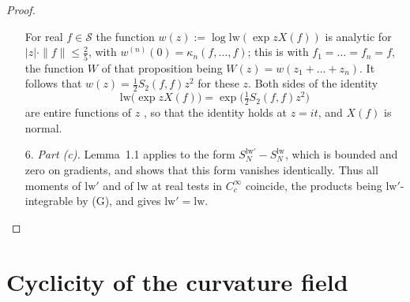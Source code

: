 \documentclass[11pt,letterpaper,reqno]{amsart}
\theoremstyle{definition}
\begin{document}
\begin{proof}
\begin{enumerate}
For real $f\in\mathcal S$ the function $w(z):=\log\mathrm{lw}(\exp zX(f))$ is analytic for $|z|\cdot\|f\|\le\tfrac25$, with $w^{(n)}(0)=\kappa_n(f,\dots,f)$; this is \cite[Proposition~7.10\,(7)]{QEDI} with $f_1=\dots=f_n=f$, the function $W$ of that proposition being $W(z)=w(z_1+\dots+z_n)$.
It follows that $w(z)=\tfrac12S_2(f,f)z^2$ for these $z$.
Both sides of the identity
\begin{equation*}
\mathrm{lw}\bigl(\exp zX(f)\bigr)=\exp\bigl(\tfrac12S_2(f,f)z^2\bigr)
\end{equation*}
are entire functions of $z$ \cite[Proposition~7.10\,(1)]{QEDI}, so that the identity holds at $z=it$, and $X(f)$ is normal.
\item[6.] \emph{Part (c).}
Lemma~1.1 applies to the form $S_N^{\mathrm{lw}'}-S_N^{\mathrm{lw}}$, which is bounded \cite[Lemma~14.3\,(b)]{QEDII} and zero on gradients, and shows that this form vanishes identically.
Thus all moments of $\mathrm{lw}'$ and of $\mathrm{lw}$ at real tests in $C_c^\infty$ coincide, the products being $\mathrm{lw}'$-integrable by (G), and \cite[Proposition~45.1\,(8),~(11)]{QEDIII} gives $\mathrm{lw}'=\mathrm{lw}$.
\end{enumerate}
\end{proof}


\section{Cyclicity of the curvature field}
\end{document}
